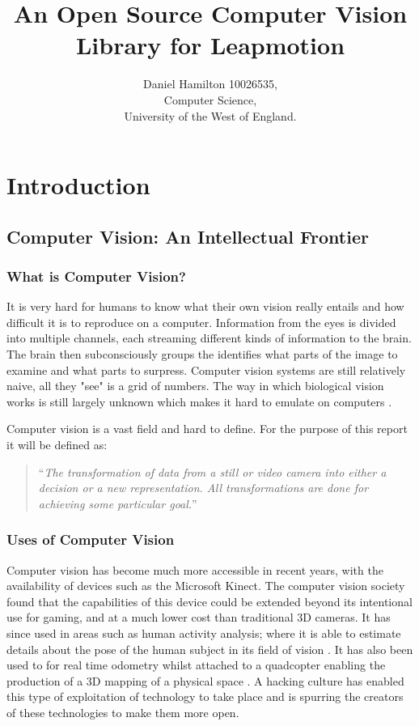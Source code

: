 \documentclass[12pt,a4paper]{report}
\title{An Open Source Computer Vision Library for Leapmotion}
\author{Daniel Hamilton 10026535,\\Computer Science,\\University of the West of England.}
\begin{document}
	\maketitle
	\tableofcontents
	\begin{abstract}
	
	\end{abstract}	
	\chapter{Introduction}
		\section{Computer Vision: An Intellectual Frontier}
			\subsection{What is Computer Vision?}		
				
It is very hard for humans to know what their own vision really entails and how difficult it is to reproduce on a computer.
Information from the eyes is divided into multiple channels, each streaming different kinds of information to the brain.
The brain then subconsciously groups the identifies what parts of the image to examine and what parts to surpress.
Computer vision systems are still relatively naive, all they "see" is a grid of numbers.
The way in which biological vision works is still largely unknown which makes it hard to emulate on computers \cite{cvMultipleViewGeometry}.
				
Computer vision is a vast field and hard to define.
For the purpose of this report it will be defined as:
	
				\begin{quote}
``\textit{The transformation of data from a still or video camera into either a decision or a new representation.
All transformations are done for achieving some particular goal.}'' \cite{cvDef}
				\end{quote}

			\subsection{Uses of Computer Vision}
Computer vision has become much more accessible in recent years, with the availability of devices such as the Microsoft Kinect.
The computer vision society found that the capabilities of this device could be extended beyond its intentional use for gaming, and at a much lower cost than traditional 3D cameras.
It has since used in areas such as human activity analysis; where it is able to estimate details about the pose of the human subject in its field of vision \cite{kinect:1}.
It has also been used to for real time odometry whilst attached to a quadcopter enabling the production of a 3D mapping of a physical space \cite{kinect:2}.
A hacking culture has enabled this type of exploitation of technology to take place and is spurring the creators of these technologies to make them more open.
\end{document}
